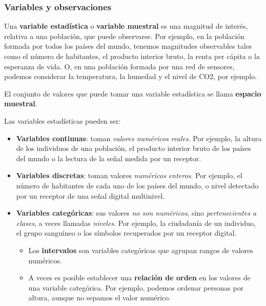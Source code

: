 \documentclass[11pt]{article}
\begin{document}
    \subsubsection*{Variables y observaciones}\label{variables-y-observaciones}

Una \textbf{variable estadística} o \textbf{variable muestral} es una
magnitud de interés, relativa a una población, que puede observarse. Por
ejemplo, en la población formada por todos los países del mundo, tenemos
magnitudes observables tales como el número de habitantes, el producto
interior bruto, la renta per cápita o la esperanza de vida. O, en una
población formada por una red de sensores, podemos considerar la
temperatura, la humedad y el nivel de CO2, por ejemplo.

El conjunto de valores que puede tomar una variable estadística se llama
\textbf{espacio muestral}.

    Las variables estadísticas pueden ser: 
 \begin{itemize}
 \item 
 \textbf{Variables continuas}:
toman \emph{valores numéricos reales}. Por ejemplo, la altura de los
individuos de una población, el producto interior bruto de los países
del mundo o la lectura de la señal medida por un receptor. 
\item
\textbf{Variables discretas}: toman valores \emph{numéricos enteros}.
Por ejemplo, el número de habitantes de cada uno de los países del
mundo, o nivel detectado por un receptor de una señal digital
multinivel. 
\item 
\textbf{Variables categóricas}: sus valores \emph{no son
numéricos}, sino \emph{pertenecientes a clases}, a veces llamadas
\emph{niveles}. Por ejemplo, la ciudadanía de un individuo, el grupo
sanguíneo o los símbolos recuperados por un receptor digital. 
\begin{itemize}
\item Los \textbf{intervalos} son variables categóricas que agrupan rangos de
valores numéricos.
\item A veces es posible establecer una \textbf{relación
de orden} en los valores de una variable categórica. Por ejemplo,
podemos ordenar personas por altura, aunque no sepamos el valor
numérico.
\end{itemize}
\end{itemize}
\end{document}
